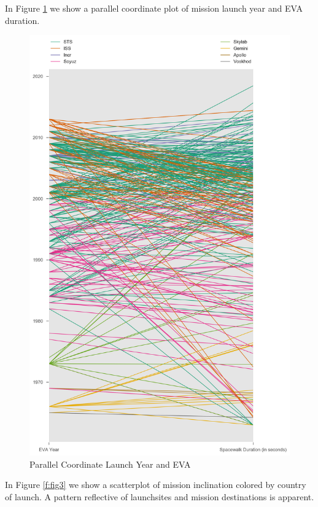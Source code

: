 \documentclass[sigconf]{acmart}
\begin{document}
In Figure \ref{f:fig2} we show a parallel coordinate plot of mission launch year and EVA duration. 

\begin{figure}[p]
	\centering\includegraphics[height=1.0\textheight]{images/fig2.png}
	\caption{Parallel Coordinate Launch Year and EVA}\label{f:fig2}
\end{figure}


In Figure \ref{f:fig3} we show a scatterplot of mission inclination colored by country of launch. A pattern reflective of launchsites and mission destinations is apparent.
\end{document}
